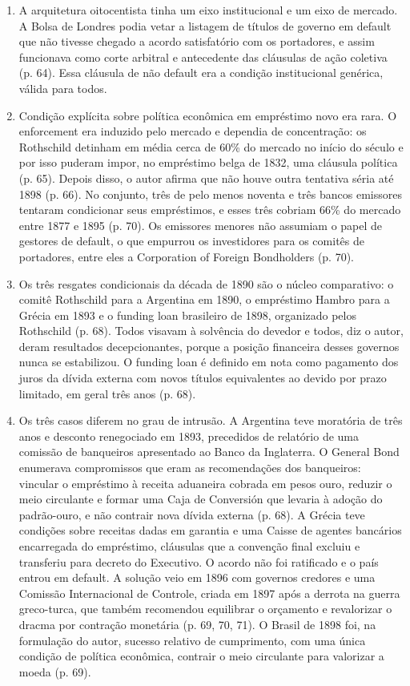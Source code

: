 \begin{enumerate}
\item A arquitetura oitocentista tinha um eixo institucional e um eixo de
mercado. A Bolsa de Londres podia vetar a listagem de títulos de governo em
default que não tivesse chegado a acordo satisfatório com os portadores, e assim
funcionava como corte arbitral e antecedente das cláusulas de ação coletiva
(p. 64). Essa cláusula de não default era a condição institucional genérica,
válida para todos.

\item Condição explícita sobre política econômica em empréstimo novo era rara. O
enforcement era induzido pelo mercado e dependia de concentração: os Rothschild
detinham em média cerca de 60\% do mercado no início do século e por isso
puderam impor, no empréstimo belga de 1832, uma cláusula política (p. 65).
Depois disso, o autor afirma que não houve outra tentativa séria até 1898
(p. 66). No conjunto, três de pelo menos noventa e três bancos emissores
tentaram condicionar seus empréstimos, e esses três cobriam 66\% do mercado
entre 1877 e 1895 (p. 70). Os emissores menores não assumiam o papel de gestores
de default, o que empurrou os investidores para os comitês de portadores, entre
eles a Corporation of Foreign Bondholders (p. 70).

\item Os três resgates condicionais da década de 1890 são o núcleo comparativo:
o comitê Rothschild para a Argentina em 1890, o empréstimo Hambro para a Grécia
em 1893 e o funding loan brasileiro de 1898, organizado pelos Rothschild
(p. 68). Todos visavam à solvência do devedor e todos, diz o autor, deram
resultados decepcionantes, porque a posição financeira desses governos nunca se
estabilizou. O funding loan é definido em nota como pagamento dos juros da
dívida externa com novos títulos equivalentes ao devido por prazo limitado, em
geral três anos (p. 68).

\item Os três casos diferem no grau de intrusão. A Argentina teve moratória de
três anos e desconto renegociado em 1893, precedidos de relatório de uma
comissão de banqueiros apresentado ao Banco da Inglaterra. O General Bond
enumerava compromissos que eram as recomendações dos banqueiros: vincular o
empréstimo à receita aduaneira cobrada em pesos ouro, reduzir o meio circulante
e formar uma Caja de Conversión que levaria à adoção do padrão-ouro, e não
contrair nova dívida externa (p. 68). A Grécia teve condições sobre receitas
dadas em garantia e uma Caisse de agentes bancários encarregada do empréstimo,
cláusulas que a convenção final excluiu e transferiu para decreto do Executivo.
O acordo não foi ratificado e o país entrou em default. A solução veio em 1896
com governos credores e uma Comissão Internacional de Controle, criada em 1897
após a derrota na guerra greco-turca, que também recomendou equilibrar o
orçamento e revalorizar o dracma por contração monetária (p. 69, 70, 71). O
Brasil de 1898 foi, na formulação do autor, sucesso relativo de cumprimento, com
uma única condição de política econômica, contrair o meio circulante para
valorizar a moeda (p. 69).


\end{enumerate}

